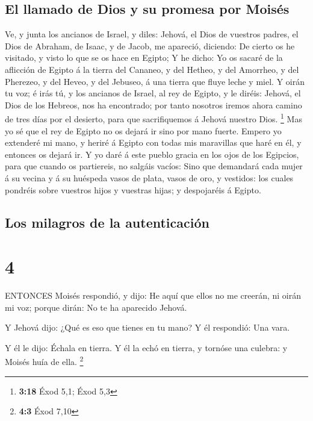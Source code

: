\hypertarget{el-llamado-de-dios-y-su-promesa-por-moisuxe9s}{%
\subsection{El llamado de Dios y su promesa por
Moisés}\label{el-llamado-de-dios-y-su-promesa-por-moisuxe9s}}

 Ve, y junta los ancianos de Israel, y diles: Jehová, el
Dios de vuestros padres, el Dios de Abraham, de Isaac, y de Jacob, me
apareció, diciendo: De cierto os he visitado, y visto lo que se os hace
en Egipto;  Y he dicho: Yo os sacaré de la aflicción de
Egipto á la tierra del Cananeo, y del Hetheo, y del Amorrheo, y del
Pherezeo, y del Heveo, y del Jebuseo, á una tierra que fluye leche y
miel.  Y oirán tu voz; é irás tú, y los ancianos de Israel,
al rey de Egipto, y le diréis: Jehová, el Dios de los Hebreos, nos ha
encontrado; por tanto nosotros iremos ahora camino de tres días por el
desierto, para que sacrifiquemos á Jehová nuestro Dios. \footnote{\textbf{3:18}
  Éxod 5,1; Éxod 5,3}  Mas yo sé que el rey de Egipto no os
dejará ir sino por mano fuerte.  Empero yo extenderé mi
mano, y heriré á Egipto con todas mis maravillas que haré en él, y
entonces os dejará ir.  Y yo daré á este pueblo gracia en
los ojos de los Egipcios, para que cuando os partiereis, no salgáis
vacíos:  Sino que demandará cada mujer á su vecina y á su
huéspeda vasos de plata, vasos de oro, y vestidos: los cuales pondréis
sobre vuestros hijos y vuestras hijas; y despojaréis á Egipto.

\hypertarget{los-milagros-de-la-autenticaciuxf3n}{%
\subsection{Los milagros de la
autenticación}\label{los-milagros-de-la-autenticaciuxf3n}}

\hypertarget{section-3}{%
\section{4}\label{section-3}}

 ENTONCES Moisés respondió, y dijo: He aquí que ellos no me
creerán, ni oirán mi voz; porque dirán: No te ha aparecido Jehová.

 Y Jehová dijo: ¿Qué es eso que tienes en tu mano? Y él
respondió: Una vara.

 Y él le dijo: Échala en tierra. Y él la echó en tierra, y
tornóse una culebra: y Moisés huía de ella. \footnote{\textbf{4:3} Éxod
  7,10}

